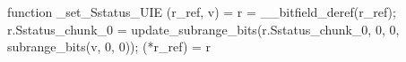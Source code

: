 function _set_Sstatus_UIE (r_ref, v) = {
    r = __bitfield_deref(r_ref);
    r.Sstatus_chunk_0 = update_subrange_bits(r.Sstatus_chunk_0, 0, 0, subrange_bits(v, 0, 0));
    (*r_ref) = r
}
